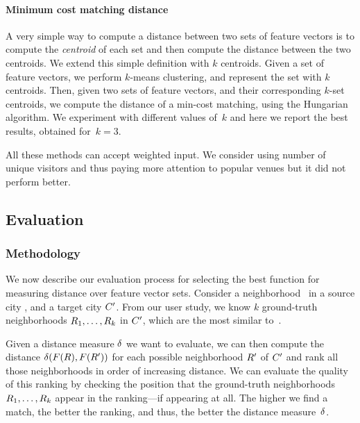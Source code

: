 \paragraph{Minimum cost matching distance}
A very simple way to compute a distance between two sets of feature vectors is
to compute the \emph{centroid} of each set and then compute the distance
between the two centroids.  We extend this simple definition with $k$
centroids.  Given a set of feature vectors, we perform $k$-means clustering,
and represent the set with $k$ centroids.  Then, given two sets of feature
vectors, and their corresponding $k$-set centroids, we compute the distance of
a min-cost matching, using the Hungarian algorithm.  We experiment with
different values of~$k$ and here we report the best results, obtained
for~$k=3$.

\bigskip

All these methods can accept weighted input. We consider using number of unique
visitors and thus paying more attention to popular venues but it did not
perform better.

\subsection{Evaluation}

\subsubsection{Methodology}
We now describe our evaluation process for selecting the best function for
measuring distance over feature vector sets. 
Consider a neighborhood \region\ in a source city \city, and a target city
${C}'$.
From our user study, we know $k$ ground-truth neighborhoods
${R}_1,\ldots,{R}_k$ in ${C}'$, which are the most 
similar to~\region.

Given a distance measure ${\delta}$ we want to evaluate, 
we can then compute the distance
${\delta}({F}({R}),{F}({R}'))$ for each possible
neighborhood ${R}'$ of ${C}'$ and rank all those neighborhoods
in order of increasing distance. 
We can evaluate the quality of this ranking by checking the position
that the ground-truth neighborhoods ${R}_1,\ldots,{R}_k$
appear in the ranking---if appearing at all. 
The higher we find a match, the better the ranking, and thus, the
better the distance measure~${\delta}$.

